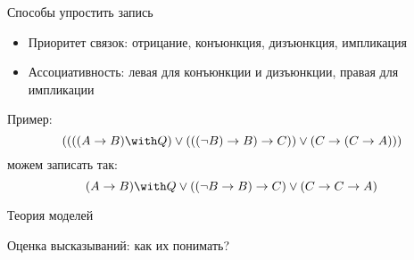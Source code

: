 \documentclass[aspectratio=169]{beamer}
\begin{document}
\begin{frame}{Способы упростить запись}
\begin{itemize}
\item Приоритет связок: отрицание, конъюнкция, дизъюнкция, импликация \pause
\item Ассоциативность: левая для конъюнкции и дизъюнкции, правая для импликации \pause
\end{itemize}
Пример:
$$((((A\rightarrow B)\with Q)\vee(((\neg B)\rightarrow B) \rightarrow C)) \vee (C \rightarrow (C\rightarrow A)))$$
можем записать так:
$$(A\rightarrow B)\with Q\vee((\neg B\rightarrow B) \rightarrow C) \vee (C \rightarrow C\rightarrow A)$$
\end{frame}

\begin{frame}{Теория моделей}

Оценка высказываний: как их понимать?


\end{frame}

\iffalse
\begin{frame}{Пример: $((A \rightarrow B) \with (B \rightarrow C)) \rightarrow (A \rightarrow C)$}


Как перевести $((A \rightarrow B) \with (B \rightarrow C)) \rightarrow (A \rightarrow C)$ на человеческий язык. \pause\vspace{0.3cm}

Пусть:

\begin{itemize}
\item A означает <<это --- кот>>;\pause
\item B означает <<это --- млекопитающее>>;\pause
\item C означает <<у этого есть селезёнка>>
\end{itemize}\pause\vspace{0.3cm}

Тогда:
\begin{center}
<<если это --- кот, {\color{blue}то} это --- млекопитающее>>\\\pause
{\color{red} и}\\\pause
<<если это --- млекопитающее, {\color{blue}то} у этого есть селезёнка>>\\\pause
{\color{red} значит}\\\pause
<<если это --- кот, {\color{blue}то} у этого есть селезёнка>>
\end{center}

\end{frame}
\fi
\end{document}

